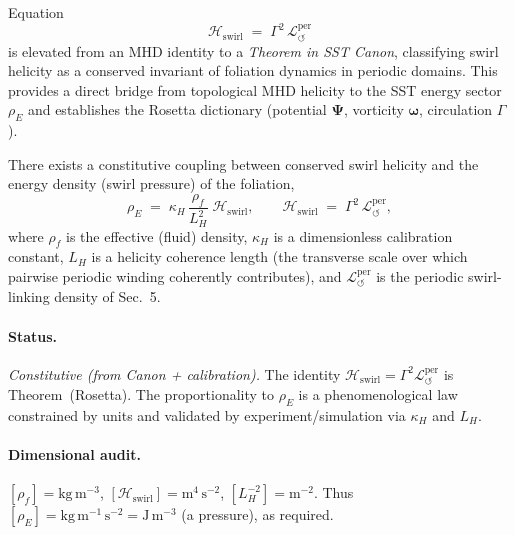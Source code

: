 \documentclass[11pt]{article}
\begin{document}
\begin{corollary}
Equation
\[
    \mathcal{H}_{\text{swirl}} \;=\; \Gamma^2 \,\mathcal{L}_{\circlearrowleft}^{\mathrm{per}}
\]
is elevated from an MHD identity to a \emph{Theorem in SST Canon},
classifying swirl helicity as a conserved invariant of foliation dynamics in periodic domains.
This provides a direct bridge from topological MHD helicity to the SST energy sector
$\rho_{\!E}$ and establishes the Rosetta dictionary (potential $\bm{\Psi}$, vorticity $\boldsymbol{\omega}$, circulation $\Gamma$).
\end{corollary}

\begin{corollary}\label{cor:helicity_energy}
There exists a constitutive coupling between conserved swirl helicity and the energy density (swirl pressure) of the foliation,
\begin{equation}
\rho_{\!E}
\;=\;
\kappa_H \,\frac{\rho_{\!f}}{L_H^{2}}\;\mathcal{H}_{\text{swirl}},
\qquad
\mathcal{H}_{\text{swirl}} \;=\; \Gamma^{2}\,\mathcal{L}_{\circlearrowleft}^{\mathrm{per}},
\tag{C5}\label{eq:C5}
\end{equation}
where $\rho_{\!f}$ is the effective (fluid) density, $\kappa_H$ is a dimensionless calibration constant, $L_H$ is a helicity coherence length (the transverse scale over which pairwise periodic winding coherently contributes), and $\mathcal{L}_{\circlearrowleft}^{\mathrm{per}}$ is the periodic swirl-linking density of Sec.~5.
\end{corollary}

\paragraph{Status.}
    \emph{Constitutive (from Canon + calibration).} The identity $\mathcal{H}_{\text{swirl}}=\Gamma^{2}\mathcal{L}_{\circlearrowleft}^{\mathrm{per}}$ is Theorem~(Rosetta). The proportionality to $\rho_{\!E}$ is a phenomenological law constrained by units and validated by experiment/simulation via $\kappa_H$ and $L_H$.

\paragraph{Dimensional audit.}
    $[\rho_{\!f}] = \mathrm{kg\,m^{-3}}$, $[\mathcal{H}_{\text{swirl}}]=\mathrm{m^{4}\,s^{-2}}$, $[L_H^{-2}] = \mathrm{m^{-2}}$.
    Thus $[\rho_{\!E}] = \mathrm{kg\,m^{-1}\,s^{-2}} = \mathrm{J\,m^{-3}}$ (a pressure), as required.
\end{document}
